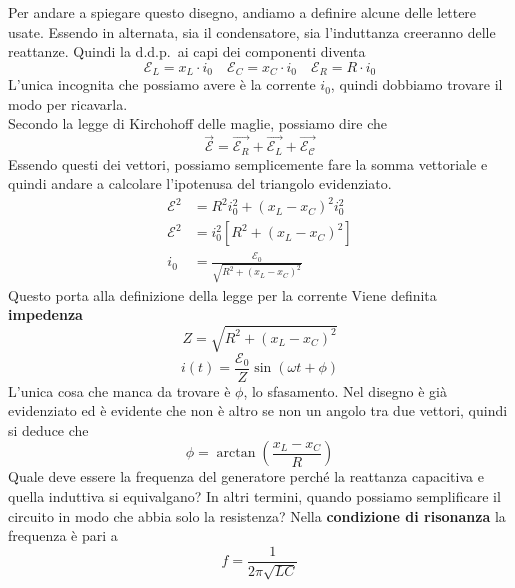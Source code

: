 Per andare a spiegare questo disegno, andiamo a definire alcune delle lettere usate. Essendo in
alternata, sia il condensatore, sia l'induttanza creeranno delle reattanze. Quindi la d.d.p.\ ai
capi dei componenti diventa 
\begin{equation*}
  \mathcal{E}_L = x_L\cdot i_0 \quad \mathcal{E}_C = x_C\cdot i_0 \quad \mathcal{E}_R = R\cdot i_0
\end{equation*}
L'unica incognita che possiamo avere è la corrente $i_0$, quindi dobbiamo trovare il modo per
ricavarla.\\
Secondo la legge di Kirchohoff delle maglie, possiamo dire che
\begin{equation*}
  \vec{\mathcal{E}} = \vec{\mathcal{E}_R} + \vec{\mathcal{E}_L} + \vec{\mathcal{E_C}}
\end{equation*}
Essendo questi dei vettori, possiamo semplicemente fare la somma
vettoriale e quindi andare a calcolare l'ipotenusa del triangolo evidenziato.
\begin{align*}
  \mathcal{E}^2 &= R^2i_0^2+(x_L-x_C)^2i_0^2\\
  \mathcal{E}^2 &= i_0^2[R^2+(x_L-x_C)^2]\\
  i_0 &= \frac{\mathcal{E}_0}{\sqrt{R^2+(x_L-x_C)^2}}
\end{align*}
Questo porta alla definizione della legge per la corrente
Viene definita \textbf{impedenza}
\begin{equation*}
  Z = \sqrt{R^2+(x_L-x_C)^2} 
\end{equation*}
\begin{equation*}
  i(t) = \frac{\mathcal{E}_0}{Z}\sin \left( \omega t+\phi \right)
\end{equation*}
L'unica cosa che manca da trovare è $\phi$, lo sfasamento. Nel disegno è già evidenziato ed è
evidente che non è altro se non un angolo tra due vettori, quindi si deduce che
\begin{equation*}
  \phi = \arctan \left( \frac{x_L-x_C}{R} \right)
\end{equation*}
Quale deve essere la frequenza del generatore perché la reattanza 
capacitiva e quella induttiva si equivalgano? In altri termini, quando possiamo semplificare
il circuito in modo che abbia solo la resistenza? Nella \textbf{condizione di risonanza}
la frequenza è pari a
\begin{equation*}
  f = \frac{1}{2\pi\sqrt{LC}}
\end{equation*}

